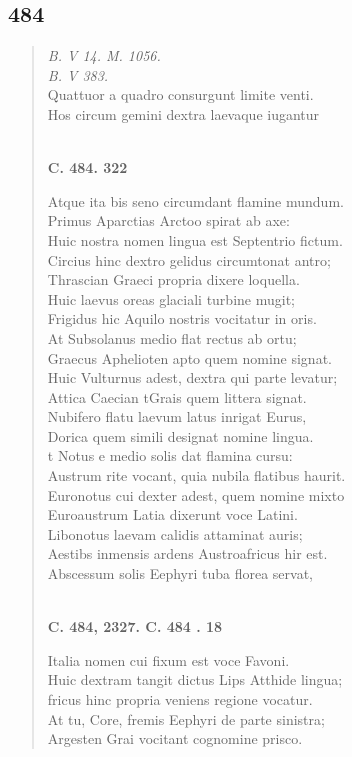 \documentclass[11pt, a4paper]{report}
\begin{document}
            \subsection*{484}
      \begin{verse}
      \textit{B. V 14. M. 1056.} \\ \textit{B. V 383.} \\ Quattuor a quadro consurgunt limite venti. \\ Hos circum gemini dextra laevaque iugantur \\ 
        ﻿\pagebreak 
    \begin{center} \textbf{C. 484. 322} \end{center}Atque ita bis seno circumdant flamine mundum. \\ Primus Aparctias Arctoo spirat ab axe: \\ Huic nostra nomen lingua est Septentrio fictum. \\ Circius hinc dextro gelidus circumtonat antro; \\ Thrascian Graeci propria dixere loquella. \\ Huic laevus oreas glaciali turbine mugit; \\ Frigidus hic Aquilo nostris vocitatur in oris. \\ At Subsolanus medio flat rectus ab ortu; \\ Graecus Aphelioten apto quem nomine signat. \\ Huic Vulturnus adest, dextra qui parte levatur; \\ Attica Caecian tGrais quem littera signat. \\ Nubifero flatu laevum latus inrigat Eurus, \\ Dorica quem simili designat nomine lingua. \\ t Notus e medio solis dat flamina cursu: \\ Austrum rite vocant, quia nubila flatibus haurit. \\ Euronotus cui dexter adest, quem nomine mixto \\ Euroaustrum Latia dixerunt voce Latini. \\ Libonotus laevam calidis attaminat auris; \\ Aestibs inmensis ardens Austroafricus hir est. \\ Abscessum solis Eephyri tuba florea servat, \\ 
        ﻿\pagebreak 
    \begin{center} \textbf{C. 484, 2327. C. 484 . 18} \end{center}Italia nomen cui fixum est voce Favoni. \\ Huic dextram tangit dictus Lips Atthide lingua; \\ fricus hinc propria veniens regione vocatur. \\ At tu, Core, fremis Eephyri de parte sinistra; \\ Argesten Grai vocitant cognomine prisco. \\ 
      \end{verse}
  
\end{document}
